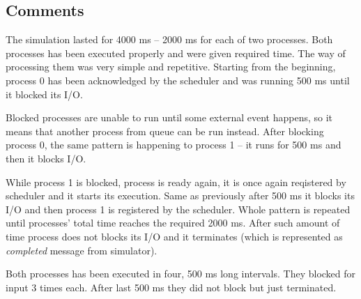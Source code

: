 \documentclass{article}
\begin{document}
\rmfamily

\subsection{Comments}
The simulation lasted for 4000 ms -- 2000 ms for each of two processes. Both processes
has been executed properly and were given required time. The way of processing them
was very simple and repetitive. Starting from the beginning, process 0 has been acknowledged
by the scheduler and was running 500 ms until it blocked its I/O.

Blocked processes are unable to run until some external event happens, so it means that
another process from queue can be run instead. After blocking process 0, the same pattern
is happening to process 1 -- it runs for 500 ms and then it blocks I/O.

While process 1 is blocked, process is ready again, it is once again reqistered by scheduler
and it starts its execution. Same as previously after 500 ms it blocks its I/O and then
process 1 is registered by the scheduler. Whole pattern is repeated until processes'
total time reaches the required 2000 ms. After such amount of time process does not
blocks its I/O and it terminates (which is represented as \emph{completed} message from
simulator).

Both processes has been executed in four, 500 ms long intervals. They blocked for input
3 times each. After last 500 ms they did not block but just terminated.
\end{document}
